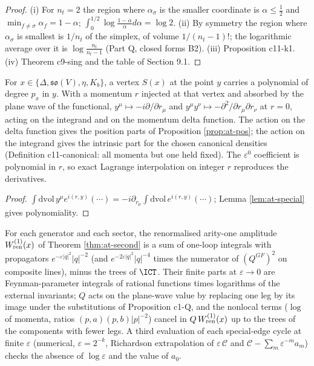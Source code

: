 \begin{proof}
(i) For $n_t=2$ the region where $\alpha_\sigma$ is the smaller coordinate is $\alpha\le\tfrac12$ and $\min_{f\ne\sigma}\alpha_f=1-\alpha$; $\int_0^{1/2}\log\frac{1-\alpha}\alpha d\alpha=\log2$. (ii) By symmetry the region where $\alpha_\sigma$ is smallest is $1/n_t$ of the simplex, of volume $1/(n_t-1)!$; the logarithmic average over it is $\log\frac{n_t}{n_t-1}$ (Part Q, closed forms B2). (iii) Proposition c11-k1. (iv) Theorem c9-sing and the table of Section 9.1.
\end{proof}

\begin{proposition}
\label{prop:at-inject}
For $x\in\{\Delta,\mathfrak{so}(V),\eta,K_b\}$, a vertex $S(x)$ at the point $y$ carries a polynomial of degree $p_x$ in $y$. With a momentum $r$ injected at that vertex and absorbed by the plane wave of the functional, $y^\mu\mapsto-i\partial/\partial r_\mu$ and $y^\mu y^\nu\mapsto-\partial^2/\partial r_\mu\partial r_\nu$ at $r=0$, acting on the integrand and on the momentum delta function. The action on the delta function gives the position parts of Proposition \ref{prop:at-pos}; the action on the integrand gives the intrinsic part for the chosen canonical densities (Definition c11-canonical: all momenta but one held fixed). The $\varepsilon^0$ coefficient is polynomial in $r$, so exact Lagrange interpolation on integer $r$ reproduces the derivatives.
\end{proposition}

\begin{proof}
$\int\mathrm{dvol}\,y^\mu e^{i(r,y)}(\cdots)=-i\partial_{r_\mu}\int\mathrm{dvol}\,e^{i(r,y)}(\cdots)$; Lemma \ref{lem:at-special} gives polynomiality.
\end{proof}

\begin{proposition}
\label{prop:at-routeB}
For each generator and each sector, the renormalised arity-one amplitude $W^{(1)}_{\rm ren}(x)$ of Theorem \ref{thm:at-second} is a sum of one-loop integrals with propagators $e^{-\varepsilon|q|^2}|q|^{-2}$ (and $e^{-2\varepsilon|q|^2}|q|^{-4}$ times the numerator of $(Q^{GF})^2$ on composite lines), minus the trees of $\ICT$. Their finite parts at $\varepsilon\to0$ are Feynman-parameter integrals of rational functions times logarithms of the external invariants; $Q$ acts on the plane-wave value by replacing one leg by its image under the substitutions of Proposition c1-Q, and the nonlocal terms ($\log$ of momenta, ratios $(p,a)(p,b)|p|^{-2}$) cancel in $Q\,W^{(1)}_{\rm ren}(x)$ up to the trees of the components with fewer legs. A third evaluation of each special-edge cycle at finite $\varepsilon$ (numerical, $\varepsilon=2^{-k}$, Richardson extrapolation of $\varepsilon\,\mathcal C$ and $\mathcal C-\sum_m\varepsilon^{-m}a_m$) checks the absence of $\log\varepsilon$ and the value of $a_0$.
\end{proposition}


